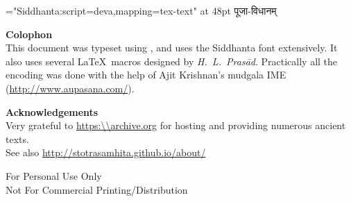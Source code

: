 \begin{titlepage}
\vspace*{6.5cm}\centerline{\font\x="Siddhanta:script=deva,mapping=tex-text" at 48pt \x पूजा-विधानम्}
\end{titlepage}
\begin{center}
\parbox{10cm}{
{\Large \textbf{Colophon}}\\
\noindent This document was typeset using \XeLaTeX, and uses the Siddhanta font extensively. It also uses several \LaTeX\ macros designed by \textit{H.~L.~Prasād}. Practically all the encoding was done with the help of Ajit Krishnan's mudgala IME (\url{http://www.aupasana.com/}).\\
\vspace*{5cm}

{\large \textbf{Acknowledgements}}\\
Very grateful to \url{https:\\archive.org} for hosting and providing numerous ancient texts.\\
See also \url{http://stotrasamhita.github.io/about/}

\vspace{4cm}

{\scshape
\centering

For Personal Use Only\\
Not For Commercial Printing/Distribution\\

}

}
\end{center}
\clearemptydoublepage
\setcounter{page}{0}
\renewcommand{\chaptermark}[1]{%
\markboth{#1}{}}
\begin{center}
\begin{large}
\tableofcontents
\end{large}
\end{center}

\mbox{}\thispagestyle{empty}
\clearpage
\setcounter{page}{0}
\setlength{\emergencystretch}{3em}
\fontsize{17pt}{22pt}\selectfont
